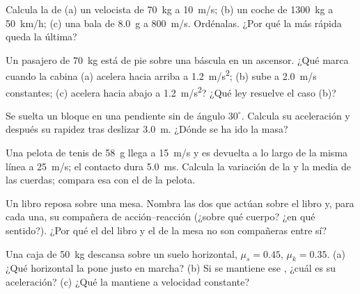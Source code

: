 \begin{exercise}[$\star$]\label{exo:g12:newtons-laws:1}
Calcula la  de (a) un velocista de \qty{70}{kg} a \qty{10}{m/s};
(b) un coche de \qty{1300}{kg} a \qty{50}{km/h}; (c) una bala de \qty{8.0}{g} a
\qty{800}{m/s}. Ordénalas. ¿Por qué la más rápida queda la última?
\end{exercise}

\begin{exercise}[$\star$]\label{exo:g12:newtons-laws:2}
Un pasajero de \qty{70}{kg} está de pie sobre una báscula en un ascensor. ¿Qué marca
cuando la cabina (a) acelera hacia arriba a \qty{1.2}{m/s^2}; (b) sube a
\qty{2.0}{m/s} constantes; (c) acelera hacia abajo a \qty{1.2}{m/s^2}? ¿Qué ley
resuelve el caso (b)?
\end{exercise}

\begin{exercise}[$\star$]\label{exo:g12:newtons-laws:3}
Se suelta un bloque en una pendiente sin  de ángulo $30^\circ$. Calcula su
aceleración y después su rapidez tras deslizar \qty{3.0}{m}. ¿Dónde se ha ido la masa?
\end{exercise}

\begin{exercise}[$\star$]\label{exo:g12:newtons-laws:4}
Una pelota de tenis de \qty{58}{g} llega a \qty{15}{m/s} y es devuelta a lo largo de
la misma línea a \qty{25}{m/s}; el contacto dura \qty{5.0}{ms}. Calcula la variación
de la  y la  media de las cuerdas; compara esa  con
el  de la pelota.
\end{exercise}

\begin{exercise}[$\star$]\label{exo:g12:newtons-laws:5}
Un libro reposa sobre una mesa. Nombra las dos  que actúan sobre el libro y,
para cada una, su compañera de acción--reacción (¿sobre qué cuerpo? ¿en qué sentido?).
¿Por qué el  del libro y el  de la mesa no son compañeras entre sí?
\end{exercise}

\begin{exercise}[$\star\star$]\label{exo:g12:newtons-laws:6}
Una caja de \qty{50}{kg} descansa sobre un suelo horizontal, $\mu_s = 0.45$,
$\mu_k = 0.35$. (a) ¿Qué  horizontal la pone justo en marcha? (b) Si se mantiene
ese , ¿cuál es su aceleración? (c) ¿Qué  la mantiene a velocidad
constante?
\end{exercise}


